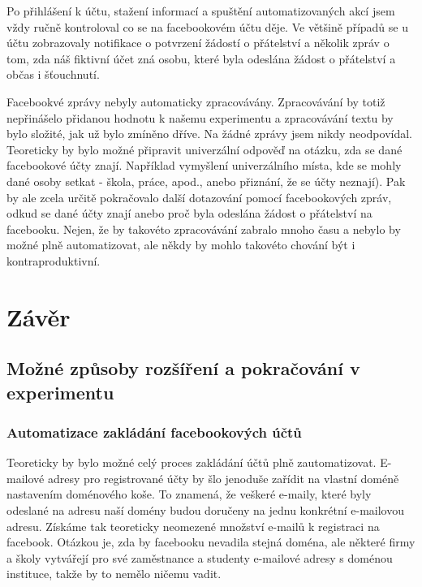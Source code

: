 \documentclass[thesis=M,czech]{FITthesis}[2013/05/10]
\begin{document}
 Po přihlášení k účtu, stažení informací a spuštění automatizovaných akcí jsem vždy ručně kontroloval co se na facebookovém účtu děje. Ve většině případů se u účtu zobrazovaly notifikace o potvrzení žádostí o přátelství a několik zpráv o tom, zda náš fiktivní účet zná osobu, které byla odeslána žádost o přátelství a občas i šťouchnutí.


Facebookvé zprávy nebyly automaticky zpracovávány. Zpracovávání by totiž nepřinášelo přidanou hodnotu k našemu experimentu a zpracovávání textu by bylo složité, jak už bylo zmíněno dříve. Na žádné zprávy jsem nikdy neodpovídal. Teoreticky by bylo možné připravit univerzální odpověď na otázku, zda se dané facebookové účty znají. Například vymyšlení univerzálního místa, kde se mohly dané osoby setkat - škola, práce, apod., anebo přiznání, že se účty neznají). Pak by ale zcela určitě pokračovalo další dotazování pomocí facebookových zpráv, odkud se dané účty znají anebo proč byla odeslána žádost o přátelství na facebooku. Nejen, že by takovéto zpracovávání zabralo mnoho času a nebylo by možné plně automatizovat, ale někdy by mohlo takovéto chování být i kontraproduktivní.


\chapter{Z{\' a}v{\v e}r}

\section{Možné způsoby rozšíření a pokračování v experimentu}

\subsection{Automatizace zakládání facebookových účtů}
Teoreticky by bylo možné celý proces zakládání účtů plně zautomatizovat. E-mailové adresy pro registrované účty by šlo jenoduše zařídit na vlastní doméně nastavením doménového koše. To znamená, že veškeré e-maily, které byly odeslané na adresu naší domény budou doručeny na jednu konkrétní e-mailovou adresu. Získáme tak teoreticky neomezené množství e-mailů k registraci na facebook. Otázkou je, zda by facebooku nevadila stejná doména, ale některé firmy a školy vytvářejí pro své zaměstnance a studenty e-mailové adresy s doménou instituce, takže by to nemělo ničemu vadit.
\end{document}
